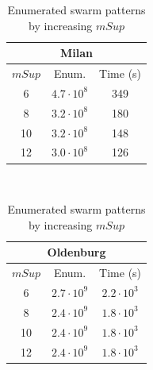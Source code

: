 \documentclass[
]{ceurart}
\renewcommand{\sf}[1]{\textsf{\textup{#1}}}
\begin{document}
\begin{table}[t]
\scriptsize\centering
\caption{Enumerated swarm patterns by increasing $mSup$}
\label{tab:effsupp}%
\begin{tabular}{ccc}
\multicolumn{3}{c}{\sf{Milan}}\\
\toprule
$mSup$ &        Enum. & Time (s) \\
\midrule
     6 &  $4.7\cdot10^{8}$ &      349 \\
     8 &  $3.2\cdot10^{8}$ &      180 \\
    10 &  $3.2\cdot10^{8}$ &      148 \\
    12 &  $3.0\cdot10^{8}$ &      126 \\
\bottomrule
\end{tabular}
~
\begin{tabular}{ccc}
\multicolumn{3}{c}{\sf{Oldenburg}}\\
\toprule
$mSup$ &  Enum. &         Time (s) \\
\midrule
 6 &  $2.7\cdot10^{9}$ &  $2.2\cdot10^{3}$ \\
 8 &  $2.4\cdot10^{9}$ &  $1.8\cdot10^{3}$ \\
10 &  $2.4\cdot10^{9}$ &  $1.8\cdot10^{3}$ \\
12 &  $2.4\cdot10^{9}$ &  $1.8\cdot10^{3}$ \\
\bottomrule
\end{tabular}

\end{table}%
\end{document}
